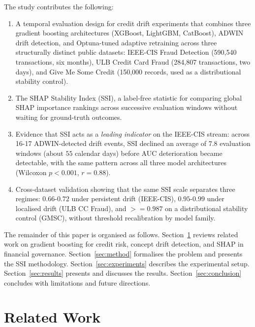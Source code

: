 \documentclass[pdflatex,sn-mathphys-num]{sn-jnl}
\theoremstyle{thmstyleone}
\theoremstyle{thmstyletwo}
\theoremstyle{thmstylethree}
\begin{document}
The study contributes the following:

\begin{enumerate}
  \item A temporal evaluation design for credit drift experiments that combines
        three gradient boosting architectures (XGBoost, LightGBM, CatBoost),
        ADWIN drift detection, and Optuna-tuned adaptive retraining across
        three structurally distinct public datasets: IEEE-CIS Fraud Detection
        (590,540 transactions, six months), ULB Credit Card Fraud (284,807
        transactions, two days), and Give Me Some Credit (150,000 records,
        used as a distributional stability control).

  \item The SHAP Stability Index (SSI), a label-free statistic for comparing
        global SHAP importance rankings across successive evaluation windows
        without waiting for ground-truth outcomes.

  \item Evidence that SSI acts as a \emph{leading indicator} on the IEEE-CIS
        stream: across 16-17 ADWIN-detected drift events, SSI declined an
        average of 7.8 evaluation windows (${\text{about }}55$ calendar days) before
        AUC deterioration became detectable, with the same pattern across all
        three model architectures (Wilcoxon $p{<}0.001$, $r{=}0.88$).

  \item Cross-dataset validation showing that the same SSI scale separates
        three regimes: $0.66$-$0.72$ under persistent drift (IEEE-CIS),
        $0.95$-$0.99$ under localised drift (ULB CC Fraud), and
        ${\mathrel{>=}}0.987$ on a distributional stability control (GMSC), without
        threshold recalibration by model family.
\end{enumerate}

The remainder of this paper is organised as follows.
Section~\ref{sec:related} reviews related work on gradient boosting for
credit risk, concept drift detection, and SHAP in financial governance.
Section~\ref{sec:method} formalises the problem and presents the SSI
methodology. Section~\ref{sec:experiments} describes the experimental setup.
Section~\ref{sec:results} presents and discusses the results.
Section~\ref{sec:conclusion} concludes with limitations and future directions.

\section{Related Work}\label{sec:related}
\end{document}
